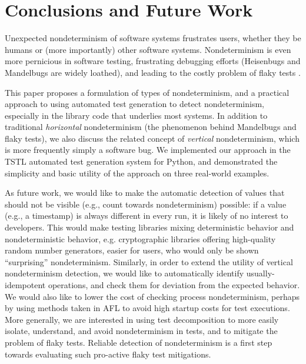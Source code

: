 \section{Conclusions and Future Work}

Unexpected nondeterminism of software systems frustrates users,
whether they be humans or (more importantly) other software systems.
Nondeterminism is even more pernicious in software testing,
frustrating debugging efforts (Heisenbugs \cite{Heisenbug} and
Mandelbugs \cite{GrottkeBugs,FaultTriggers} are widely loathed), and
leading to the costly problem of flaky tests
\cite{miccoflaky,listfieldtestanalysis}.

This paper proposes a formulation of types of nondeterminism, and a
practical approach to using automated test generation to detect
nondeterminism, especially in the library code that underlies most
systems. In addition to traditional \emph{horizontal} nondeterminism
(the phenomenon behind Mandelbugs and flaky tests), we also discuss
the related concept of \emph{vertical} nondeterminism, which is more
frequently simply a software bug.  We implemented our approach in the
TSTL automated test generation system for Python, and demonstrated the
simplicity and basic utility of the approach on three real-world examples.

As future work, we would like to make the automatic detection of
values that should not be visible (e.g., count towards nondeterminism)
possible: if a value (e.g., a timestamp) is always different in every
run, it is likely of no interest to developers.  This would make
testing libraries mixing deterministic behavior and nondeterministic
behavior, e.g. cryptographic libraries offering high-quality random
number generators, easier for users, who would only be shown
``surprising'' nondeterminism.  Similarly, in order to extend the
utility of vertical nondeterminism detection, we would like to
automatically identify usually-idempotent operations, and check them
for deviation from the expected behavior.  We would also like to lower the cost
of checking process nondeterminism, perhaps by using methods taken in
AFL \cite{aflfuzz} to avoid high startup costs for test executions.
More generally, we are interested in using test decomposition
\cite{Composition} to more easily isolate, understand, and avoid
nondeterminism in tests, and to mitigate the problem of flaky tests.
Reliable detection of nondeterminism is a first step towards
evaluating such pro-active flaky test mitigations.

